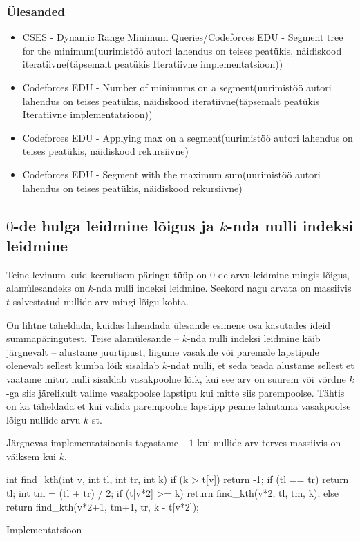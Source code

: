\documentclass{trkut}
\begin{document}
\subsubsection{Ülesanded}
\begin{itemize}
    \item CSES - Dynamic Range Minimum Queries/Codeforces EDU - Segment tree for the minimum(uurimistöö autori lahendus on teises peatükis, näidiskood iteratiivne(täpsemalt peatükis Iteratiivne implementatsioon))
    \item Codeforces EDU - Number of minimums on a segment(uurimistöö autori lahendus on teises peatükis, näidiskood iteratiivne(täpsemalt peatükis Iteratiivne implementatsioon))
    \item Codeforces EDU - Applying max on a segment(uurimistöö autori lahendus on teises peatükis, näidiskood rekursiivne)
    \item Codeforces EDU - Segment with the maximum sum(uurimistöö autori lahendus on teises peatükis, näidiskood rekursiivne)
\end{itemize}

\subsection{$0$-de hulga leidmine lõigus ja $k$-nda nulli indeksi leidmine}

Teine levinum kuid keerulisem päringu tüüp on $0$-de arvu leidmine mingis lõigus, alamülesandeks on $k$-nda nulli indeksi leidmine.
Seekord nagu arvata on massiivis $t$ salvestatud nullide arv mingi lõigu kohta. \parencite{EMaxx}

On lihtne täheldada, kuidas lahendada ülesande esimene osa kasutades ideid summapäringutest. Teise alamülesande -- $k$-nda nulli indeksi leidmine käib järgnevalt -- alustame juurtipust, liigume vasakule või paremale lapstipule olenevalt sellest kumba lõik sisaldab $k$-ndat nulli, et seda teada alustame sellest et vaatame mitut nulli sisaldab vasakpoolne lõik, kui see arv on suurem või võrdne $k$-ga siis järelikult valime vasakpoolse lapstipu kui mitte siis parempoolse. Tähtis on ka täheldada et kui valida parempoolne lapstipp peame lahutama vasakpoolse lõigu nullide arvu $k$-st. \parencite{EMaxx}

Järgnevas implementatsioonis tagastame $-1$ kui nullide arv terves massiivis on väiksem kui $k$. \parencite{EMaxx}
\begin{cclol}
int find_kth(int v, int tl, int tr, int k) {
    if (k > t[v])
        return -1;
    if (tl == tr)
        return tl;
    int tm = (tl + tr) / 2;
    if (t[v*2] >= k)
        return find_kth(v*2, tl, tm, k);
    else 
        return find_kth(v*2+1, tm+1, tr, k - t[v*2]);
}
\end{cclol}
 \begin{kk}[H]%
    \caption{Implementatsioon}%
    \label{EMaxx}%
    \end{kk}
\end{document}
